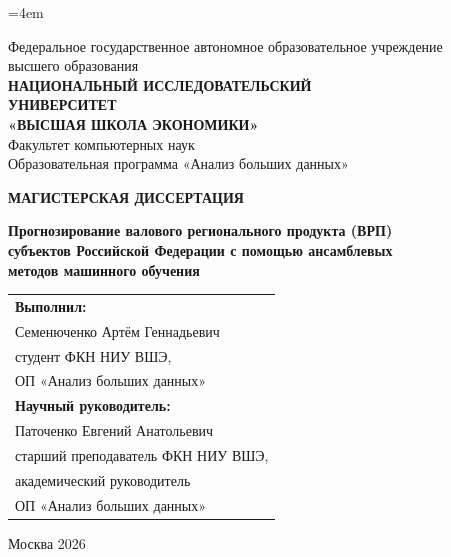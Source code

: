 \documentclass[12pt,a4paper]{article}
\begin{document}
\graphicspath{{../grp_forecast/figures/}}
\emergencystretch=4em
\sloppy

\begin{titlepage}
\begin{center}
{\small Федеральное государственное автономное образовательное учреждение\\
высшего образования\\[4pt]
\textbf{НАЦИОНАЛЬНЫЙ ИССЛЕДОВАТЕЛЬСКИЙ\\
УНИВЕРСИТЕТ\\
«ВЫСШАЯ ШКОЛА ЭКОНОМИКИ»}\\[8pt]
Факультет компьютерных наук\\
Образовательная программа «Анализ больших данных»}

\vspace{3cm}

{\Large\textbf{МАГИСТЕРСКАЯ ДИССЕРТАЦИЯ}}

\vspace{1cm}

{\large\textbf{Прогнозирование валового регионального продукта (ВРП)\\
субъектов Российской Федерации с помощью ансамблевых\\
методов машинного обучения}}

\vspace{3cm}

\begin{flushright}
\begin{tabular}{l}
\textbf{Выполнил:}\\
Семенюченко Артём Геннадьевич\\
студент ФКН НИУ ВШЭ,\\
ОП «Анализ больших данных»\\[12pt]
\textbf{Научный руководитель:}\\
Паточенко Евгений Анатольевич\\
старший преподаватель ФКН НИУ ВШЭ,\\
академический руководитель\\
ОП «Анализ больших данных»
\end{tabular}
\end{flushright}

\vfill
Москва 2026
\end{center}
\end{titlepage}
\end{document}

